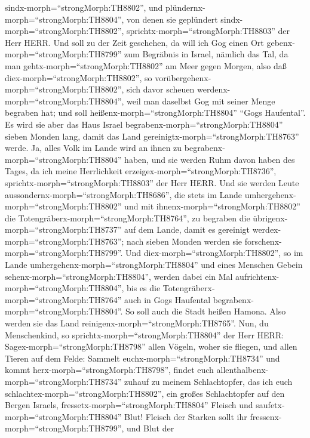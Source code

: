 sindx-morph=``strongMorph:TH8802'', und
plündernx-morph=``strongMorph:TH8804'', von denen sie geplündert
sindx-morph=``strongMorph:TH8802'',
sprichtx-morph=``strongMorph:TH8803'' der Herr HERR.  Und
soll zu der Zeit geschehen, da will ich Gog einen Ort
gebenx-morph=``strongMorph:TH8799'' zum Begräbnis in Israel, nämlich das
Tal, da man gehtx-morph=``strongMorph:TH8802'' am Meer gegen Morgen,
also daß diex-morph=``strongMorph:TH8802'', so
vorübergehenx-morph=``strongMorph:TH8802'', sich davor scheuen
werdenx-morph=``strongMorph:TH8804'', weil man daselbst Gog mit seiner
Menge begraben hat; und soll heißenx-morph=``strongMorph:TH8804'' ``Gogs
Haufental''.  Es wird sie aber das Haus Israel
begrabenx-morph=``strongMorph:TH8804'' sieben Monden lang, damit das
Land gereinigtx-morph=``strongMorph:TH8763'' werde.  Ja,
alles Volk im Lande wird an ihnen zu
begrabenx-morph=``strongMorph:TH8804'' haben, und sie werden Ruhm davon
haben des Tages, da ich meine Herrlichkeit
erzeigex-morph=``strongMorph:TH8736'',
sprichtx-morph=``strongMorph:TH8803'' der Herr HERR.  Und
sie werden Leute aussondernx-morph=``strongMorph:TH8686'', die stets im
Lande umhergehenx-morph=``strongMorph:TH8802'' und mit
ihnenx-morph=``strongMorph:TH8802'' die
Totengräberx-morph=``strongMorph:TH8764'', zu begraben die
übrigenx-morph=``strongMorph:TH8737'' auf dem Lande, damit es gereinigt
werdex-morph=``strongMorph:TH8763''; nach sieben Monden werden sie
forschenx-morph=``strongMorph:TH8799''.  Und
diex-morph=``strongMorph:TH8802'', so im Lande
umhergehenx-morph=``strongMorph:TH8804'' und eines Menschen Gebein
sehenx-morph=``strongMorph:TH8804'', werden dabei ein Mal
aufrichtenx-morph=``strongMorph:TH8804'', bis es die
Totengräberx-morph=``strongMorph:TH8764'' auch in Gogs Haufental
begrabenx-morph=``strongMorph:TH8804''.  So soll auch die
Stadt heißen Hamona. Also werden sie das Land
reinigenx-morph=``strongMorph:TH8765''.  Nun, du
Menschenkind, so sprichtx-morph=``strongMorph:TH8804'' der Herr HERR:
Sagex-morph=``strongMorph:TH8798'' allen Vögeln, woher sie fliegen, und
allen Tieren auf dem Felde: Sammelt euchx-morph=``strongMorph:TH8734''
und kommt herx-morph=``strongMorph:TH8798'', findet euch
allenthalbenx-morph=``strongMorph:TH8734'' zuhauf zu meinem
Schlachtopfer, das ich euch schlachtex-morph=``strongMorph:TH8802'', ein
großes Schlachtopfer auf den Bergen Israels,
fressetx-morph=``strongMorph:TH8804'' Fleisch und
saufetx-morph=``strongMorph:TH8804'' Blut!  Fleisch der
Starken sollt ihr fressenx-morph=``strongMorph:TH8799'', und Blut der
